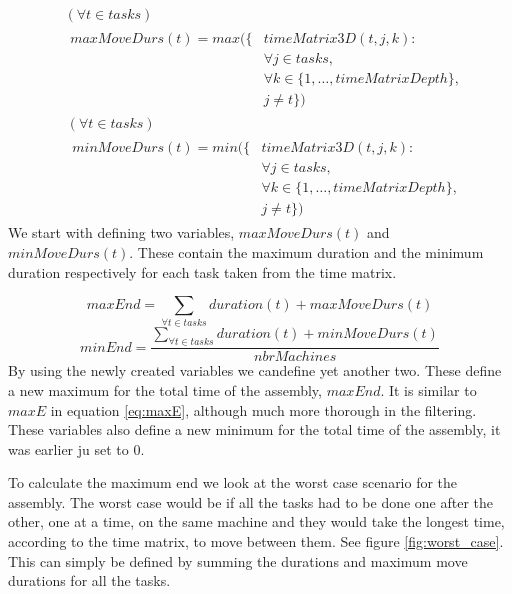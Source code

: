 \begin{equation}
 \begin{aligned}\label{eq:57}
 &( \forall t \in tasks)\\
 &\begin{aligned}
 maxMoveDurs(t) = max(\{&timeMatrix3D(t,j,k) :\\
 &\forall j \in tasks, \\
 &\forall k \in \{1 , \ldots , timeMatrixDepth\},\\
 &j \neq t\})
 \end{aligned}
 \end{aligned}
 \end{equation}
  \begin{equation}
  \begin{aligned}\label{eq:58}
  &(\forall t \in tasks)\\
  &\begin{aligned}
  minMoveDurs(t) = min(\{&timeMatrix3D(t,j,k) :\\
  &\forall j \in tasks, \\
  &\forall k \in \{1 , \ldots , timeMatrixDepth\},\\
  &j \neq t\})
  \end{aligned}
  \end{aligned}
  \end{equation}
We start with defining two variables, $maxMoveDurs(t)$ and $minMoveDurs(t)$. These contain the maximum duration and the minimum duration respectively for each task taken from the time matrix.
 
 \begin{equation}\label{eq:59}
	maxEnd = \sum_{\forall t \in tasks} duration(t) + maxMoveDurs(t)
 \end{equation}
 \begin{equation}\label{eq:minEnd}
 	minEnd = \frac{\sum_{\forall t \in tasks} duration(t) + minMoveDurs(t)}{nbrMachines}
 \end{equation}
By using the newly created variables we candefine yet another two. These define a new maximum for the total time of the assembly, $maxEnd$. It is similar to $maxE$ in equation \ref{eq:maxE}, although much more thorough in the filtering. These variables also define a new minimum for the total time of the assembly, it was earlier ju set to 0.

To calculate the maximum end we look at the worst case scenario for the assembly. The worst case would be if all the tasks had to be done one after the other, one at a time, on the same machine and they would take the longest time, according to the time matrix, to move between them. See figure \ref{fig:worst_case}. This can simply be defined by summing the durations and maximum move durations for all the tasks.

